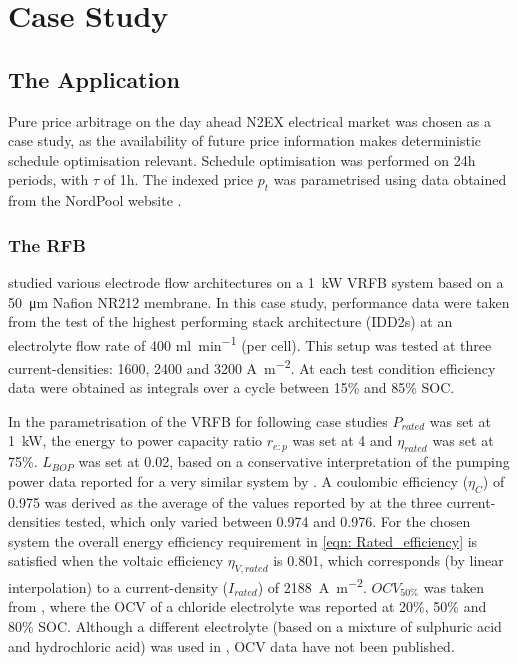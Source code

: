 \documentclass[preprint,3p,review,authoryear,10pt]{elsarticle}
\begin{document}
\section{Case Study}
\label{Case Study}

\subsection{The Application}
\label{Results_The_Application}
Pure price arbitrage on the day ahead N2EX electrical market was chosen as a case study, as the availability of future price information makes deterministic schedule optimisation relevant. Schedule optimisation was performed on 24h periods, with $\tau$ of 1h. The indexed price $p_t$ was parametrised using data obtained from the NordPool website \cite{NordPool2016}.

\subsubsection{The RFB}
\label{Model_Formulation_VRFB_Params}
\cite{Reed2016} studied various electrode flow architectures on a \SI{1}{\kilo\watt} VRFB system based on a \SI{50}{\micro\meter} Nafion NR212 membrane. In this case study, performance data were taken from the test of the highest performing stack architecture (IDD2s) at an electrolyte flow rate of 400 \si{\ml\per\minute} (per cell). This setup was tested at three current-densities: 1600, 2400 and 3200 \si{\ampere\per\square\meter}. At each test condition efficiency data were obtained as integrals over a cycle between 15\% and 85\% SOC. 

In the parametrisation of the VRFB for following case studies $P_{rated}$ was set at \SI{1}{\kilo\watt}, the energy to power capacity ratio $r_{e:p}$ was set at 4 and $\eta_{rated}$ was set at 75\%. $L_{BOP}$ was set at 0.02, based on a conservative interpretation of the pumping power data reported for a very similar system by \cite{Kim2013}. A coulombic efficiency ($\eta_C$) of 0.975 was derived as the average of the values reported by \cite{Reed2016} at the three current-densities tested, which only varied between 0.974 and 0.976.  For the chosen system  the overall energy efficiency requirement in \cref{eqn: Rated_efficiency} is satisfied when the voltaic efficiency $\eta_{V,rated}$ is 0.801, which corresponds (by linear interpolation) to a current-density ($I_{rated}$) of \SI{2188}{\ampere\per\square\meter}. $OCV_{50\%}$ was taken from \cite{Kim2011}, where the OCV of a chloride electrolyte was reported at 20\%, 50\% and 80\% SOC. Although a different electrolyte (based on a mixture of sulphuric acid and hydrochloric acid) was used in \cite{Reed2016}, OCV data have not been published.
\end{document}
